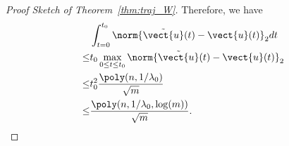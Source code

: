 \begin{proof}[Proof Sketch of Theorem~\ref{thm:traj_W}]
	Therefore, we have \begin{align*}
	&\int_{t=0}^{t_0}\norm{\tilde{\vect{u}}(t)-\vect{u}(t)}_2 dt \\
	\le &t_0 \max_{0\le t\le t_0} \norm{\tilde{\vect{u}}(t)-\vect{u}(t)}_2 \\
	\le &t_0^2 \frac{\poly(n,1/\lambda_0)}{\sqrt{m}} \\
	\le &\frac{\poly(n,1/\lambda_0,\log(m))}{\sqrt{m}}.
	\end{align*}
\end{proof}